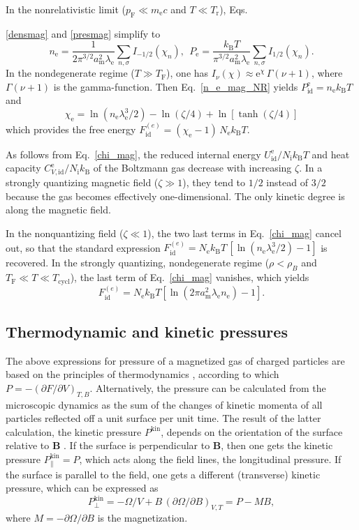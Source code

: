 \documentclass[traditabstract]{aa}
\newcommand{\beq}{\begin{equation}}
\newcommand{\eeq}{\end{equation}}
\newcommand{\req}[1]{Eq.~\ref{#1}}
\newcommand{\chie}{\chi_\mathrm{e}}
\newcommand{\lambde}{\lambda_\mathrm{e}}
\newcommand{\mel}{m_\mathrm{e}}
\newcommand{\nel}{n_\mathrm{e}}
\newcommand{\Nel}{N_\mathrm{e}}
\newcommand{\Nion}{N_\mathrm{i}}
\newcommand{\kB}{k_\mathrm{B}}
\newcommand{\pF}{p_\mathrm{F}}
\newcommand{\TF}{T_\mathrm{F}}
\begin{document}
In the nonrelativistic limit ($\pF\ll \mel c$ and
$T\ll T_\mathrm{r}$), Eqs.~{\ref{densmag} and
\ref{presmag} simplify to
\beq
   \nel = \frac{1}{2\pi^{3/2} a_\mathrm{m}^2 \lambde}
     \sum_{n,\sigma} I_{-1/2}(\chi_n),
~~
   P_\mathrm{e} = \frac{\kB T}{\pi^{3/2} a_\mathrm{m}^2\lambde}
     \sum_{n,\sigma} I_{1/2}(\chi_n).
\label{n_e_mag_NR}
\end{equation}
In the nondegenerate regime ($T\gg T_\mathrm{F}$),
one has $I_\nu(\chi)\approx \mathrm{e}^{\chi}\,\Gamma(\nu+1)$,
where $\Gamma(\nu+1)$ is the gamma-function.
Then \req{n_e_mag_NR}
yields $P_\mathrm{id}^\mathrm{e} = \nel \kB T$
and
\beq
   \chie =  \ln(\nel \lambde^3/2) - \ln (\zeta/4) +
                   \ln[\tanh (\zeta/4)]
\label{chi_mag}
\eeq
which provides the free energy
$F_\mathrm{id}^{(e)} =(\chie - 1)\,\Nel\kB T$. 

As follows from \req{chi_mag}, the reduced internal energy
$U_\mathrm{id}^\mathrm{e}/\Nion\kB T$ and heat capacity
$C_{V,\mathrm{id}}^\mathrm{e}/\Nion\kB$ of the Boltzmann gas
decrease with increasing $\zeta$. In a strongly quantizing
magnetic field ($\zeta\gg1$), they tend to $1/2$  instead of
$3/2$ because the gas becomes effectively one-dimensional.
The only kinetic degree is along the magnetic
field.

In the nonquantizing field ($\zeta\ll1$), the two last terms
in \req{chi_mag} cancel out, so that the standard expression
$F_\mathrm{id}^{(e)} = \Nel\kB T \,[\ln(\nel \lambde^3/2)
-1]$ is recovered. In the strongly quantizing, nondegenerate
regime ($\rho<\rho_B$ and $\TF\ll T\ll T_\mathrm{cycl}$),
the last term of \req{chi_mag} vanishes, which yields
\beq
   F_\mathrm{id}^{(e)} =
      \Nel \kB T \left[ \ln(2\pi a_\mathrm{m}^2\lambde \nel)
         - 1 \right].
\label{Fe-magn}
\end{equation}

\subsection{Thermodynamic and kinetic pressures}

The above expressions for pressure of a magnetized gas of
charged particles are based on the principles of
thermodynamics \citep{LaLi-SP1}, according to which
$P=-(\partial F/\partial V)_{T,B}$. Alternatively, the pressure
can be calculated from the microscopic dynamics as the sum
of the changes of kinetic momenta of all particles reflected
off a unit surface per unit time. The result of the latter
calculation, the kinetic pressure $P^\mathrm{kin}$,
depends on the orientation of the surface relative to 
$\bm{B}$ \citep{CanutoChiu}. If the surface is perpendicular
to $\bm{B}$, then one gets the kinetic pressure
$P_\|^\mathrm{kin}=P$, which acts along the field lines, the
longitudinal pressure. If the
surface is parallel to the field, one gets a different
(transverse) kinetic pressure,  which can be expressed
\citep{BlandfordHernquist} as 
\beq
   P_\perp^\mathrm{kin} =
       -\Omega/V + B\,(\partial\Omega/\partial B)_{V,T}
         = P-M B, 
\eeq
where
$
   M=-\partial\Omega/\partial B
$
is the magnetization. 

}
\end{document}

